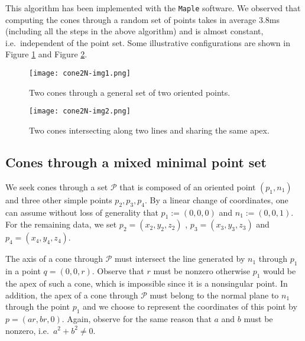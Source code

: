 \documentclass[5p]{elsarticle}
\newcommand\Pc{\mathcal P}
\newcommand{\com}[1]{{\color{black} #1}}
\begin{document}
This algorithm has been implemented with the {\tt Maple} software. We observed that \com{computing} the \com{cones} through a random set of points takes in average 3.8ms \com{(including all the steps in the above algorithm)} and is almost constant, \com{i.e.~independent} of the point set. Some illustrative configurations are shown in Figure \ref{fig:cone2N-1} and Figure \ref{fig:cone2N-2}.

 \begin{figure}
 	\centering
	\texttt{[image: cone2N-img1.png]}
    \caption{Two cones through a general set of two oriented points.}\label{fig:cone2N-1}
 \end{figure}

  \begin{figure}
 	 \centering
	 	 	     \texttt{[image: cone2N-img2.png]}
    \caption{Two cones intersecting along two lines and sharing the same apex.}\label{fig:cone2N-2}
 \end{figure}

\subsection{Cones through a mixed minimal point set}
 \com{We seek} cones through a set $\Pc$ \com{that} is composed of an oriented point $(p_1,n_1)$ and three other simple points $p_2,p_3,p_4$. By a linear change of coordinates, one can assume without loss of generality that $p_1:=(0,0,0)$ and  $n_1:=(0,0,1)$. For the remaining data, we set $p_2=(x_2,y_2,z_2)$ , $p_3=(x_3,y_3,z_3)$ and $p_4=(x_4,y_4,z_4)$.
 
\medskip 
 
 
The axis of a cone through $\Pc$ must intersect the line generated by $n_1$ through $p_1$ in a point $q=(0,0,r)$. Observe that $r$ must be nonzero otherwise $p_1$ would be the apex of such a cone, which is impossible since it is a nonsingular point. In addition, the apex of a cone through $\Pc$ must belong to the normal plane to $n_1$ through the point $p_1$ and we choose to represent the coordinates of this point by $p=(ar,br,0)$. Again, observe for the same reason that $a$ and $b$ must be nonzero, i.e.~$a^2+b^2\neq 0$. 
\end{document}
